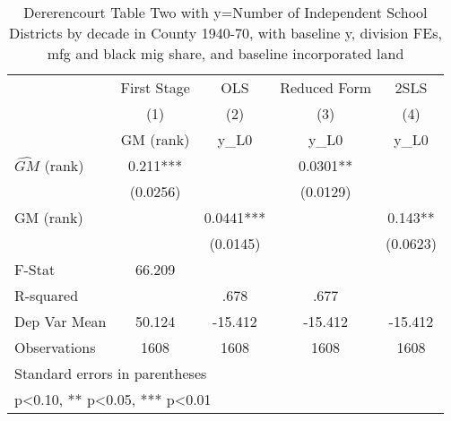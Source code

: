 \begin{table}[htbp]\centering
\def\sym#1{\ifmmode^{#1}\else\(^{#1}\)\fi}
\caption{Dererencourt Table Two with y=Number of Independent School Districts by decade in County 1940-70, with baseline y, division FEs, mfg and black mig share, and baseline incorporated land}
\begin{tabular}{l*{4}{c}}
\toprule
                    & First Stage   &         OLS   &Reduced Form   &        2SLS   \\
                    &\multicolumn{1}{c}{(1)}&\multicolumn{1}{c}{(2)}&\multicolumn{1}{c}{(3)}&\multicolumn{1}{c}{(4)}\\
                    &\multicolumn{1}{c}{GM  (rank)}&\multicolumn{1}{c}{y\_L0}&\multicolumn{1}{c}{y\_L0}&\multicolumn{1}{c}{y\_L0}\\
\midrule
$\hat{GM}$ (rank)   &       0.211***&               &      0.0301** &               \\
                    &    (0.0256)   &               &    (0.0129)   &               \\
\addlinespace
GM  (rank)          &               &      0.0441***&               &       0.143** \\
                    &               &    (0.0145)   &               &    (0.0623)   \\
\midrule
F-Stat              &      66.209   &               &               &               \\
R-squared           &               &        .678   &        .677   &               \\
Dep Var Mean        &      50.124   &     -15.412   &     -15.412   &     -15.412   \\
Observations        &        1608   &        1608   &        1608   &        1608   \\
\bottomrule
\multicolumn{5}{l}{\footnotesize Standard errors in parentheses}\\
\multicolumn{5}{l}{\footnotesize * p<0.10, ** p<0.05, *** p<0.01}\\
\end{tabular}
\end{table}
